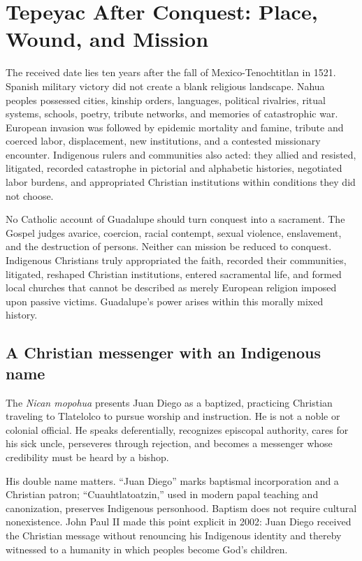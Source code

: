 \section{Tepeyac After Conquest: Place, Wound, and Mission}

The received date lies ten years after the fall of Mexico-Tenochtitlan in 1521. Spanish military victory did not create a blank religious landscape. Nahua peoples possessed cities, kinship orders, languages, political rivalries, ritual systems, schools, poetry, tribute networks, and memories of catastrophic war. European invasion was followed by epidemic mortality and famine, tribute and coerced labor, displacement, new institutions, and a contested missionary encounter. Indigenous rulers and communities also acted: they allied and resisted, litigated, recorded catastrophe in pictorial and alphabetic histories, negotiated labor burdens, and appropriated Christian institutions within conditions they did not choose.

No Catholic account of Guadalupe should turn conquest into a sacrament. The Gospel judges avarice, coercion, racial contempt, sexual violence, enslavement, and the destruction of persons. Neither can mission be reduced to conquest. Indigenous Christians truly appropriated the faith, recorded their communities, litigated, reshaped Christian institutions, entered sacramental life, and formed local churches that cannot be described as merely European religion imposed upon passive victims. Guadalupe's power arises within this morally mixed history.

\subsection{A Christian messenger with an Indigenous name}

The \emph{Nican mopohua} presents Juan Diego as a baptized, practicing Christian traveling to Tlatelolco to pursue worship and instruction. He is not a noble or colonial official. He speaks deferentially, recognizes episcopal authority, cares for his sick uncle, perseveres through rejection, and becomes a messenger whose credibility must be heard by a bishop.

His double name matters. “Juan Diego” marks baptismal incorporation and a Christian patron; “Cuauhtlatoatzin,” used in modern papal teaching and canonization, preserves Indigenous personhood. Baptism does not require cultural nonexistence. John Paul II made this point explicit in 2002: Juan Diego received the Christian message without renouncing his Indigenous identity and thereby witnessed to a humanity in which peoples become God's children.

